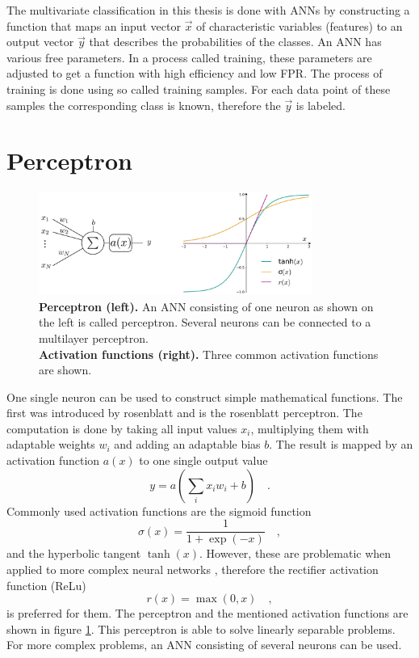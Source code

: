 The multivariate classification in this thesis is done with ANNs by constructing a function that maps an input vector $\vec{x}$ of characteristic variables (features) to an output vector $\vec{y}$ that describes the probabilities of the classes. An ANN has various free parameters. In a process called training, these parameters are adjusted to get a function with high efficiency and low FPR. The process of training is done using so called training samples. For each data point of these samples the corresponding class is known, therefore the $\vec{y}$ is labeled. 

\section{Perceptron} \label{sec:ch_4_perceptron}
\begin{figure}
\centering
\includegraphics[width=0.8\textwidth]{chapter_4_stat/perceptronAndActivation.png}
\caption[Perceptron and Activation Function]{\textbf{Perceptron (left).} An ANN consisting of one neuron as shown on the left is called perceptron. Several neurons can be connected to a multilayer perceptron. \\
\textbf{Activation functions (right).} Three common activation functions are shown.}
\label{fig:ch_4_perceptron}
\end{figure}
One single neuron can be used to construct simple mathematical functions. The first was introduced by rosenblatt and is the rosenblatt perceptron. The computation is done by taking all input values $x_i$, multiplying them with adaptable weights $w_i$ and adding an adaptable bias $b$. The result is mapped by an activation function $a(x)$ to one single output value
\begin{equation}
y = a\left(\sum_i x_i w_i + b\right) \quad .
\end{equation}
Commonly used activation functions are the sigmoid function
\begin{equation}\label{eq:ch4_sigmoid}
\sigma(x) = \frac{1}{1+\exp(-x)}	\quad ,
\end{equation}
and the hyperbolic tangent $\tanh(x)$. However, these are problematic when applied to more complex neural networks \cite{VanishingGradientProblem}, therefore the rectifier activation function (ReLu) \cite{relu}
\begin{equation}\label{eq:ch4_relu}
r(x) = \max(0,x)	\quad ,
\end{equation}
is preferred for them. The perceptron and the mentioned activation functions are shown in figure \ref{fig:ch_4_perceptron}. This perceptron is able to solve linearly separable problems. For more complex problems, an ANN consisting of several neurons can be used.


